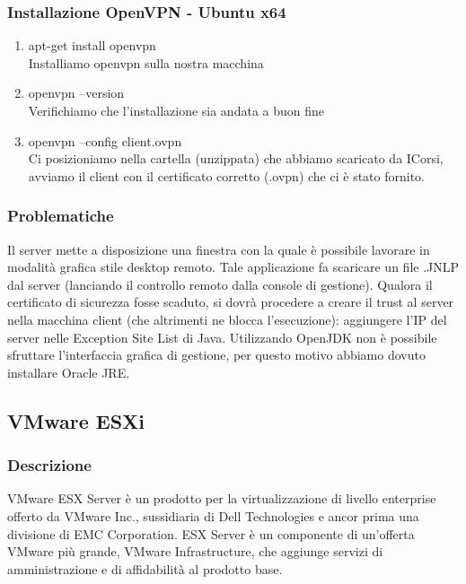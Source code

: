 \documentclass{article}
\begin{document}
\subsubsection{Installazione OpenVPN - Ubuntu x64}
\begin{enumerate}
    \item apt-get install openvpn \\ 
    Installiamo openvpn sulla nostra macchina
    \item openvpn --version \\
    Verifichiamo che l'installazione sia andata a buon fine
    \item openvpn --config client.ovpn \\
    Ci posizioniamo nella cartella (unzippata) che abbiamo scaricato da ICorsi,
    avviamo il client con il certificato corretto (.ovpn) che ci è stato fornito.
\end{enumerate}

\subsubsection{Problematiche} 
    Il server mette a disposizione una finestra con la quale è possibile lavorare in modalità
    grafica stile desktop remoto. Tale applicazione fa scaricare un file .JNLP dal server
    (lanciando il controllo remoto dalla console di gestione). Qualora il certificato di
    sicurezza fosse scaduto, si dovrà procedere a creare il trust al server nella macchina
    client (che altrimenti ne blocca l’esecuzione): aggiungere l’IP del server nelle Exception
    Site List di Java. Utilizzando OpenJDK non è possibile sfruttare l'interfaccia grafica di gestione, per questo 
    motivo abbiamo dovuto installare Oracle JRE.

\subsection{VMware ESXi}
\subsubsection{Descrizione}
VMware ESX Server è un prodotto per la virtualizzazione di livello enterprise offerto da VMware Inc., sussidiaria di Dell Technologies e ancor prima una divisione di EMC Corporation. ESX Server è un componente di un'offerta VMware più grande, VMware Infrastructure, che aggiunge servizi di amministrazione e di affidabilità al prodotto base. 
\end{document}
